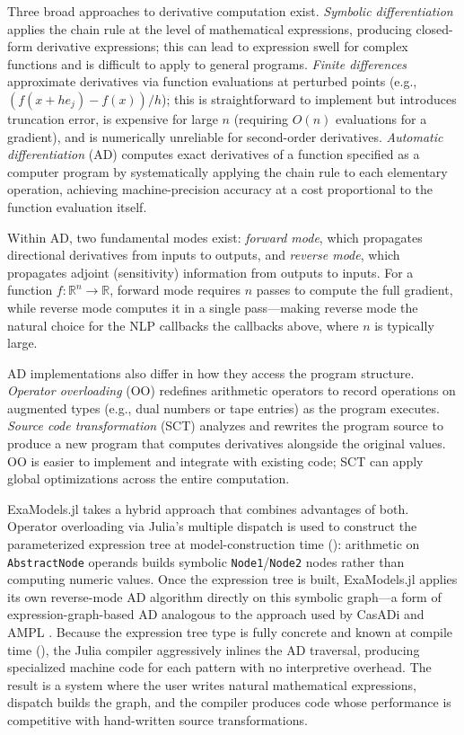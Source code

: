 \documentclass[11pt]{article}
\begin{document}
Three broad approaches to derivative computation exist. \emph{Symbolic differentiation} applies the chain rule at the level of mathematical expressions, producing closed-form derivative expressions; this can lead to expression swell for complex functions and is difficult to apply to general programs. \emph{Finite differences} approximate derivatives via function evaluations at perturbed points (e.g., $(f(x+he_j) - f(x))/h$); this is straightforward to implement but introduces truncation error, is expensive for large $n$ (requiring $O(n)$ evaluations for a gradient), and is numerically unreliable for second-order derivatives. \emph{Automatic differentiation} (AD) computes exact derivatives of a function specified as a computer program by systematically applying the chain rule to each elementary operation, achieving machine-precision accuracy at a cost proportional to the function evaluation itself.

Within AD, two fundamental modes exist: \emph{forward mode}, which propagates directional derivatives from inputs to outputs, and \emph{reverse mode}, which propagates adjoint (sensitivity) information from outputs to inputs. For a function $f:\mathbb{R}^n \to \mathbb{R}$, forward mode requires $n$ passes to compute the full gradient, while reverse mode computes it in a single pass---making reverse mode the natural choice for the NLP callbacks the callbacks above, where $n$ is typically large.

AD implementations also differ in how they access the program structure. \emph{Operator overloading} (OO) redefines arithmetic operators to record operations on augmented types (e.g., dual numbers or tape entries) as the program executes. \emph{Source code transformation} (SCT) analyzes and rewrites the program source to produce a new program that computes derivatives alongside the original values. OO is easier to implement and integrate with existing code; SCT can apply global optimizations across the entire computation.

ExaModels.jl takes a hybrid approach that combines advantages of both. Operator overloading via Julia's multiple dispatch is used to construct the parameterized expression tree at model-construction time (): arithmetic on \texttt{AbstractNode} operands builds symbolic \texttt{Node1}/\texttt{Node2} nodes rather than computing numeric values. Once the expression tree is built, ExaModels.jl applies its own reverse-mode AD algorithm directly on this symbolic graph---a form of expression-graph-based AD analogous to the approach used by CasADi \citep{anderssonCasADiSoftwareFramework2019} and AMPL \citep{fourerModelingLanguageMathematical1990}. Because the expression tree type is fully concrete and known at compile time (), the Julia compiler aggressively inlines the AD traversal, producing specialized machine code for each pattern with no interpretive overhead. The result is a system where the user writes natural mathematical expressions, dispatch builds the graph, and the compiler produces code whose performance is competitive with hand-written source transformations.
\end{document}
